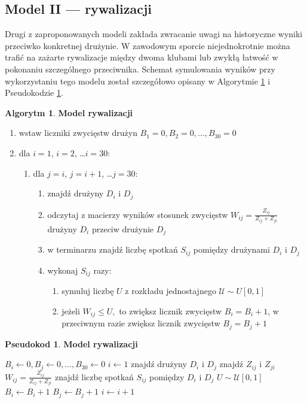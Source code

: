 \documentclass[inzynierska]{pwr_wmat_praca_dyplomowa}
\theoremstyle{plain}
\numberwithin{theorem}{chapter}
\theoremstyle{definition}
\numberwithin{theorem}{chapter}
\newtheorem{algorytm}[theorem]{Algorytm}
\newtheorem{pseudokod}[theorem]{Pseudokod}
\begin{document}
\subsection{Model II --- rywalizacji}
Drugi z zaproponowanych modeli zakłada zwracanie uwagi na historyczne wyniki przeciwko konkretnej drużynie. W zawodowym sporcie niejednokrotnie można trafić na zażarte rywalizacje między dwoma klubami lub zwykłą łatwość w pokonaniu szczególnego przeciwnika. Schemat symulowania wyników przy wykorzystaniu tego modelu został szczegółowo opisany w Algorytmie \ref{algorytm2} i Pseudokodzie \ref{pseudokod2}.

\begin{algorytm} \label{algorytm2}
	\textbf{Model rywalizacji}
	\begin{enumerate}
		\item wstaw liczniki zwycięstw drużyn $B_1= 0,B_2= 0,\dots, B_{30}= 0$
		\item dla $i=1$, $i=2$, \dots $i=30$: 
		\begin{enumerate}
			\item dla $j=i$, $j=i+1$, \dots $j=30$: 
			\begin{enumerate}
				\item znajdź drużyny $D_i$ i $D_j$
				\item odczytaj z macierzy wyników stosunek zwycięstw $W_{ij}=\frac{Z_{ij}}{Z_{ij}+Z_{ji}}$ drużyny $D_i$ przeciw drużynie $D_j$   
				\item w terminarzu znajdź liczbę spotkań $S_{ij}$ pomiędzy drużynami $D_i$ i $D_j$
				\item wykonaj $S_{ij}$ razy:
				\begin{enumerate}
					\item symuluj liczbę $U$ z rozkładu jednostajnego $\mathcal{U}\sim U[0,1]$ 
					\item jeżeli $W_{ij} \leq U,$ to zwiększ licznik zwycięstw $B_i=B_i+1$, w przeciwnym razie zwiększ licznik zwycięstw $B_j=B_j+1$
				\end{enumerate}
			\end{enumerate}
		\end{enumerate}
	\end{enumerate}
\end{algorytm} 

\begin{pseudokod} \label{pseudokod2}
	\textbf{Model rywalizacji}
	\begin{algorithmic}[1]
		\State $B_i\gets 0,B_j\gets 0,\dots, B_{30}\gets 0$
		\State $i\gets 1$
		\State znajdź drużyny $D_i$ i $D_j$
		\State znajdź $Z_{ij}$ i $Z_{ji}$ 
		\State $W_{ij}=\frac{Z_{ij}}{Z_{ij}+Z_{ji}}$
		\State znajdź liczbę spotkań $S_{ij}$ pomiędzy $D_i$ i $D_j$
		\State $U\sim \mathcal{U}[0,1]$
		\State $B_i \gets B_i+1$
		\Else
		\State $B_j \gets B_j+1$
		\EndIf
		\EndFor
		\EndFor
		\State $i\gets i+1$
		\EndWhile
	\end{algorithmic}
\end{pseudokod}
\end{document}
